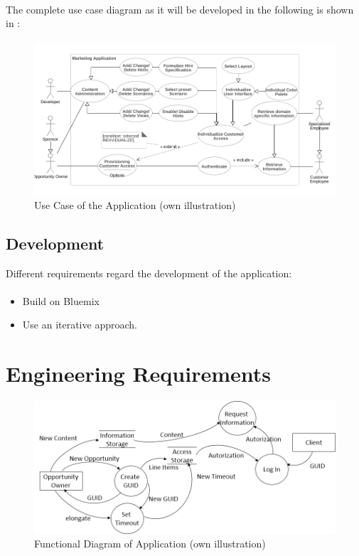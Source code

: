 \paragraph{}
The complete use case diagram as it will be developed in the following is shown in :
\paragraph{}
\begin{figure}[H]
    \centering
    \includegraphics[width=\textwidth]{img/diagrams/UseCase.png}
    \caption[Use Case of the Application]{Use Case of the Application (own illustration)}
    \label{fig:ucucuc}
\end{figure}


\subsection{Development}
Different requirements regard the development of the application: 
\paragraph{}
\begin{itemize}
    \item Build on Bluemix
    \item Use an iterative approach.
\end{itemize}

\section{Engineering Requirements}

\begin{figure}[H]
    \centering
    \includegraphics[width=\textwidth]{img/diagrams/FunctionDiagram.png}
    \caption[Functional Diagram of Application]{Functional Diagram of Application (own illustration)}
    \label{fig:}
\end{figure}

